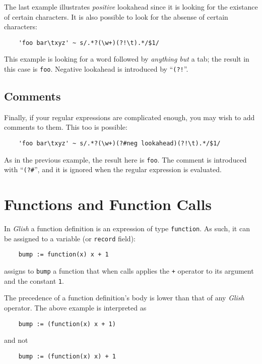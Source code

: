 The last example illustrates {\em positive} lookahead since it is
looking for the existance of certain characters. It is also possible to
look for the absense of certain characters:
\begin{verbatim}
    'foo bar\txyz' ~ s/.*?(\w+)(?!\t).*/$1/
\end{verbatim}
This example is looking for a word followed by {\em anything but}
a tab; the result in this case is {\tt foo}. Negative lookahead is
introduced by ``\verb+(?!+''.

\subsection{Comments}
Finally, if your regular expressions are complicated enough, you may wish
to add comments to them. This too is possible:
\begin{verbatim}
    'foo bar\txyz' ~ s/.*?(\w+)(?#neg lookahead)(?!\t).*/$1/
\end{verbatim}
As in the previous example, the result here is {\tt foo}. The comment is
introduced with ``\verb+(?#+'', and it is ignored when the regular
expression is evaluated.

\section{Functions and Function Calls}
\label{func-exprs}

In {\em Glish} a function definition is an expression of type {\tt function}.
As such, it can be assigned to a variable (or {\tt record} field):
\begin{verbatim}
    bump := function(x) x + 1
\end{verbatim}
assigns to {\tt bump} a function that when calls applies the {\tt +}
operator to its argument and the constant {\tt 1}.

The precedence of a function definition's body is lower than that of
any {\em Glish} operator.  The above example is interpreted as
\begin{verbatim}
    bump := (function(x) x + 1)
\end{verbatim}
and not
\begin{verbatim}
    bump := (function(x) x) + 1
\end{verbatim}

